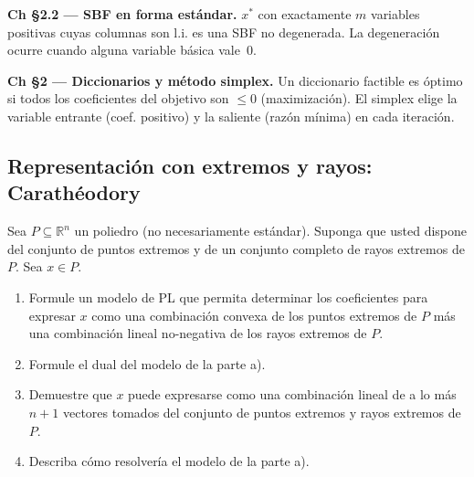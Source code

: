 \documentclass[12pt]{article}
\theoremstyle{plain}
\begin{document}
\begin{teofund}
\textbf{Ch §2.2 — SBF en forma estándar.} $x^*$ con exactamente $m$ variables positivas cuyas columnas son l.i. es una SBF no degenerada. La degeneración ocurre cuando alguna variable básica vale~0.

\textbf{Ch §2 — Diccionarios y método simplex.} Un diccionario factible es óptimo si todos los coeficientes del objetivo son $\leq 0$ (maximización). El simplex elige la variable entrante (coef. positivo) y la saliente (razón mínima) en cada iteración.
\end{teofund}

\bigskip

\subsection{Representación con extremos y rayos: Carathéodory}

Sea $P \subseteq \mathbb{R}^n$ un poliedro (no necesariamente estándar). Suponga que usted
dispone del conjunto de puntos extremos y de un conjunto completo de rayos extremos de
$P$. Sea $x \in P$.

\begin{enumerate}[label=\alph*)]
      \item Formule un modelo de PL que permita determinar los coeficientes para
            expresar $x$ como una combinación convexa de los puntos extremos de $P$ más
            una combinación lineal no-negativa de los rayos extremos de $P$.

      \item Formule el dual del modelo de la parte a).

      \item Demuestre que $x$ puede expresarse como una combinación lineal de a lo más
            $n+1$ vectores tomados del conjunto de puntos extremos y rayos extremos de $P$.

      \item Describa cómo resolvería el modelo de la parte a).
\end{enumerate}
\end{document}
